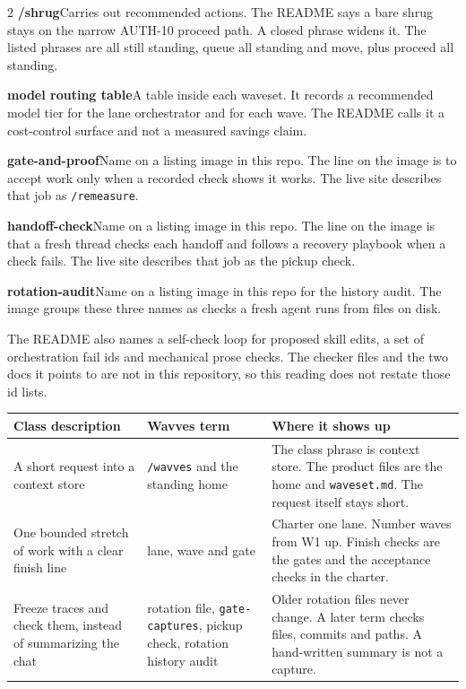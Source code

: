\documentclass[10pt]{article}
\newcommand{\sect}[1]{%
  \par\addvspace{0.75em}%
  \noindent{\normalsize\bfseries #1}\par\nopagebreak
  \addvspace{0.2em}%
  \noindent\ignorespaces
}
\begin{document}
\begin{multicols}{2}
\textbf{/shrug}\quad Carries out recommended actions. The README says a bare shrug stays on the narrow AUTH-10 proceed path. A closed phrase widens it. The listed phrases are all still standing, queue all standing and move, plus proceed all standing.

\textbf{model routing table}\quad A table inside each waveset. It records a recommended model tier for the lane orchestrator and for each wave. The README calls it a cost-control surface and not a measured savings claim.

\textbf{gate-and-proof}\quad Name on a listing image in this repo. The line on the image is to accept work only when a recorded check shows it works. The live site describes that job as \texttt{/remeasure}.

\textbf{handoff-check}\quad Name on a listing image in this repo. The line on the image is that a fresh thread checks each handoff and follows a recovery playbook when a check fails. The live site describes that job as the pickup check.

\textbf{rotation-audit}\quad Name on a listing image in this repo for the history audit. The image groups these three names as checks a fresh agent runs from files on disk.

\par\noindent The README also names a self-check loop for proposed skill edits, a set of orchestration fail ids and mechanical prose checks. The checker files and the two docs it points to are not in this repository, so this reading does not restate those id lists.
\end{multicols}

\sect{Three ways the class already described the work}

\begin{center}
\small
\renewcommand{\arraystretch}{1.15}
\begin{tabularx}{\linewidth}{@{}>{\raggedright\arraybackslash}p{1.7in}>{\raggedright\arraybackslash}p{1.55in}X@{}}
\hline
\rowcolor{tabhead}
Class description & Wavves term & Where it shows up \\
\hline
A short request into a context store &
\texttt{/wavves} and the standing home &
The class phrase is context store. The product files are the home and \texttt{waveset.md}. The request itself stays short. \\
\hline
One bounded stretch of work with a clear finish line &
lane, wave and gate &
Charter one lane. Number waves from W1 up. Finish checks are the gates and the acceptance checks in the charter. \\
\hline
Freeze traces and check them, instead of summarizing the chat &
rotation file, \texttt{gate-captures}, pickup check, rotation history audit &
Older rotation files never change. A later term checks files, commits and paths. A hand-written summary is not a capture. \\
\hline
\end{tabularx}
\end{center}
\end{document}
